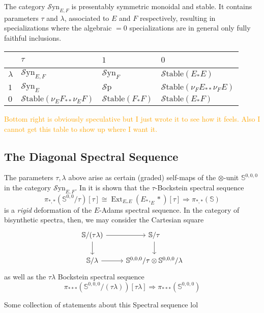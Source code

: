 \documentclass[10pt]{amsart}
\theoremstyle{definition}
\numberwithin{figure}{section}
\numberwithin{equation}{section}
\newenvironment{manualtheorem}[1]{%
    \renewcommand\themanualtheoreminner{#1}%
  \manualtheoreminner
}{\endmanualtheoreminner}
\newcommand{\Ext}{\operatorname{Ext}}
\theoremstyle{cited}
\newcommand{\bS}{\mathbb{S}}
\newcommand{\Sp}{{\mathcal{S}\mathrm{p}}}
\newcommand{\Syn}{\mathcal{S}\mathrm{yn}}
\newcommand{\Stable}{\mathcal{S}\mathrm{table}}
\begin{document}
\begin{manualtheorem}{B}
  The category $\Syn_{E,F}$ is presentably symmetric monoidal and stable. It contains parameters $\tau$ and $\lambda$, associated to $E$ and $F$ respectively, resulting in specializations where the algebraic $= 0$ specializations are in general only fully faithful inclusions.
  \begin{table}[!ht]
    \centering
    \begin{tabular}{|l|l|l|l|}
    \hline
        ~ & $\tau$ & $1$ & $0$ \\ \hline
        $\lambda$ & $\Syn_{E,F}$ & $\Syn_F$ & $\Stable(E_*E)$ \\ \hline
        $1$ & $\Syn_E$ & $\Sp$ & $\Stable(\nu_FE_{**}\nu_FE)$ \\ \hline
        $0$ & $\Stable(\nu_EF_{**}\nu_EF)$ & $\Stable(F_*F)$ & $\Stable(E_*F)$ \\ \hline
    \end{tabular}
  \end{table}
\end{manualtheorem}

\textcolor{orange}{Bottom right is obviously speculative but I just wrote it to see how it feels. Also I cannot get this table to show up where I want it.}

\subsection{The Diagonal Spectral Sequence}

The parameters $\tau,\lambda$ above arise as certain (graded) self-maps of the $\otimes$-unit $\bS^{0,0,0}$ in the category $\Syn_{E,F}$. In \cite{Pst22} it is shown that the $\tau$-Bockstein spectral sequence
\[
\pi_{*,*}(\bS^{0,0}/\tau)[\tau] \cong \Ext_{E_*E}(E_*,_E*)[\tau] \Rightarrow \pi_{*,*}(\bS)
\]
is a \textit{rigid} deformation of the $E$-Adams spectral sequence. In the category of bisynthetic spectra, then, we may consider the Cartesian square
\[\begin{tikzcd}
	{\bS/(\tau\lambda)} & {\bS/\tau} \\
	{\bS/\lambda} & {\bS^{0,0,0}/\tau\otimes \bS^{0,0,0}/\lambda}
	\arrow[from=1-1, to=1-2]
	\arrow[from=1-1, to=2-1]
	\arrow[from=1-2, to=2-2]
	\arrow[from=2-1, to=2-2]
\end{tikzcd}\]
as well as the $\tau\lambda$ Bockstein spectral sequence
\[
\pi_{***}(\bS^{0,0,0}/(\tau\lambda))[\tau\lambda]\Rightarrow \pi_{***}(\bS^{0,0,0})
\]
\begin{manualtheorem}{C}
  Some collection of statements about this Spectral sequence lol
\end{manualtheorem}
\end{document}
